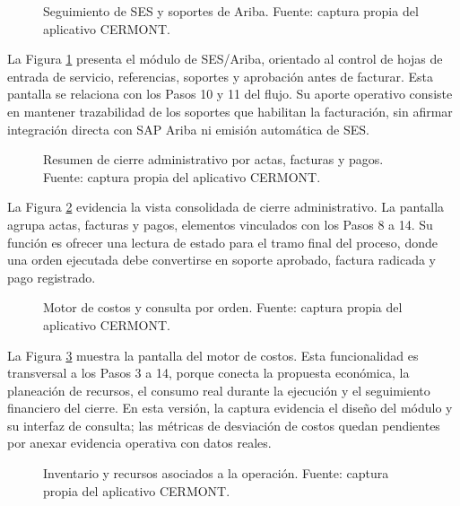 \begin{figure}[H]
\centering
{}
\caption{Seguimiento de SES y soportes de Ariba. Fuente: captura propia del aplicativo CERMONT.}
\label{fig:captura-ses-ariba}
\end{figure}

La Figura \ref{fig:captura-ses-ariba} presenta el módulo de SES/Ariba, orientado al control de hojas de entrada de servicio, referencias, soportes y aprobación antes de facturar. Esta pantalla se relaciona con los Pasos 10 y 11 del flujo. Su aporte operativo consiste en mantener trazabilidad de los soportes que habilitan la facturación, sin afirmar integración directa con SAP Ariba ni emisión automática de SES.

\begin{figure}[H]
\centering
{}
\caption{Resumen de cierre administrativo por actas, facturas y pagos. Fuente: captura propia del aplicativo CERMONT.}
\label{fig:captura-cierre-administrativo}
\end{figure}

La Figura \ref{fig:captura-cierre-administrativo} evidencia la vista consolidada de cierre administrativo. La pantalla agrupa actas, facturas y pagos, elementos vinculados con los Pasos 8 a 14. Su función es ofrecer una lectura de estado para el tramo final del proceso, donde una orden ejecutada debe convertirse en soporte aprobado, factura radicada y pago registrado.

\begin{figure}[H]
\centering
{}
\caption{Motor de costos y consulta por orden. Fuente: captura propia del aplicativo CERMONT.}
\label{fig:captura-motor-costos}
\end{figure}

La Figura \ref{fig:captura-motor-costos} muestra la pantalla del motor de costos. Esta funcionalidad es transversal a los Pasos 3 a 14, porque conecta la propuesta económica, la planeación de recursos, el consumo real durante la ejecución y el seguimiento financiero del cierre. En esta versión, la captura evidencia el diseño del módulo y su interfaz de consulta; las métricas de desviación de costos quedan pendientes por anexar evidencia operativa con datos reales.

\begin{figure}[H]
\centering
{}
\caption{Inventario y recursos asociados a la operación. Fuente: captura propia del aplicativo CERMONT.}
\label{fig:captura-inventario-recursos}
\end{figure}


